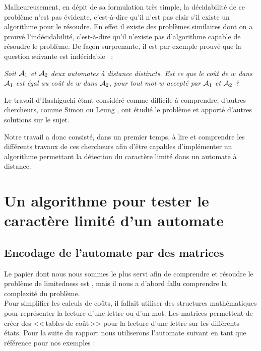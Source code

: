 \documentclass[12pt]{memoir}
\begin{document}
\medskip
Malheureusement, en dépit de sa formulation très simple, la décidabilité de ce problème n'est pas évidente, c'est-à-dire qu'il n'est
pas clair s'il existe un algorithme pour le résoudre. En effet
il existe des problèmes similaires dont on a prouvé l'indécidabilité, c'est-à-dire qu'il n'existe pas d'algorithme capable de résoudre le
problème. De façon surprenante, il est par exemple prouvé que la question suivante est indécidable~\cite{Krob:equality-problem-rational-series:1993:a} :
\begin{center}
\textit{Soit $\mathcal{A}_{1}$ et $\mathcal{A}_{2}$ deux automates à distance distincts. Est
  ce que le coût de $w$ dans $\mathcal{A}_{1}$ est égal au coût de $w$ dans
  $\mathcal{A}_{2}$, pour tout mot $w$ accepté par $\mathcal{A}_{1} $ et $\mathcal{A}_{2}$ ?}
\end{center}
Le travail d'Hashiguchi étant considéré comme difficile à comprendre, d'autres chercheurs, comme Simon \cite{Simon:Semigroups-Matrices-over-Tropical:1994:a} ou Leung \cite{Leung&Podolskiy:limitedness-problem-distance-automata::2004:a}, ont étudié le problème et apporté d'autres solutions sur le sujet.

Notre travail a donc consisté, dans un premier temps, à lire et comprendre les
différents travaux de ces chercheurs afin d'être capables d'implémenter un
algorithme permettant la détection du caractère limité dans un automate à distance.

\chapter{Un algorithme pour tester le caractère limité d'un automate}
\label{cha:un-algorithme-pour}

\section{Encodage de l'automate par des matrices}

Le papier dont nous nous sommes le plus servi afin de comprendre et résoudre le problème de limitedness est \cite{Simon:Semigroups-Matrices-over-Tropical:1994:a}, mais il nous a d'abord fallu comprendre la complexité du problème.\\
Pour simplifier les calculs de coûts, il fallait utiliser des structures mathématiques pour représenter la lecture d'une lettre ou d'un mot. Les matrices permettent de créer des <<\,tables de coût\,>> pour la lecture d'une lettre sur les différents états. Pour la suite du rapport nous utiliserons l'automate suivant en tant que référence pour nos exemples :
\end{document}
